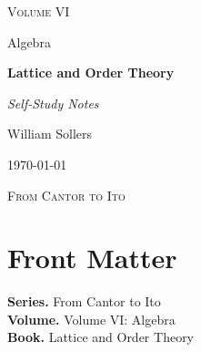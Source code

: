 \documentclass[12pt, a4paper]{report}
\begin{document}
\ExplSyntaxOff
\renewcommand{\familydefault}{\rmdefault}

\begin{titlepage}
\centering
\vspace*{3.5cm}

{\Large\scshape Volume VI\par}
\vspace{0.35cm}
{\large Algebra\par}

\vspace{1.4cm}

{\Huge\bfseries Lattice and Order Theory\par}

\vspace{0.6cm}
{\large\itshape Self-Study Notes\par}

\vfill

{\large William Sollers\par}
\vspace{0.35cm}
{\large \today\par}

\vfill

{\large\scshape From Cantor to Ito\par}
\end{titlepage}

\clearpage
\thispagestyle{plain}
\chapter*{Front Matter}
\noindent\textbf{Series.} From Cantor to Ito\\[0.5em]
\textbf{Volume.} Volume VI: Algebra\\[0.5em]
\textbf{Book.} Lattice and Order Theory

\clearpage
\tableofcontents
\clearpage
{}



\clearpage



\printindex[tech]
\printindex[dep]
\end{document}
